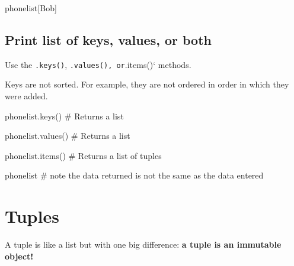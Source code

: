 \documentclass[
  letterpaper,
  DIV=11,
  numbers=noendperiod]{scrreprt}
\newenvironment{Shaded}{\begin{snugshade}}{\end{snugshade}}
\newcommand{\CommentTok}[1]{\textcolor[rgb]{0.37,0.37,0.37}{#1}}
\newcommand{\NormalTok}[1]{\textcolor[rgb]{0.00,0.23,0.31}{#1}}
\newcommand{\StringTok}[1]{\textcolor[rgb]{0.13,0.47,0.30}{#1}}
\begin{document}
\begin{Shaded}
\begin{Highlighting}[]
\NormalTok{phonelist[}\StringTok{\textquotesingle{}Bob\textquotesingle{}}\NormalTok{]}
\end{Highlighting}
\end{Shaded}

\hypertarget{print-list-of-keys-values-or-both-1}{%
\section{Print list of keys, values, or
both}\label{print-list-of-keys-values-or-both-1}}

Use the \texttt{.keys()},
\texttt{.values()\textquotesingle{},\ or}.items()` methods.

Keys are not sorted. For example, they are not ordered in order in which
they were added.

\begin{Shaded}
\begin{Highlighting}[]
\NormalTok{phonelist.keys() }\CommentTok{\# Returns a list}
\end{Highlighting}
\end{Shaded}

\begin{Shaded}
\begin{Highlighting}[]
\NormalTok{phonelist.values() }\CommentTok{\# Returns a list}
\end{Highlighting}
\end{Shaded}

\begin{Shaded}
\begin{Highlighting}[]
\NormalTok{phonelist.items() }\CommentTok{\# Returns a list of tuples}
\end{Highlighting}
\end{Shaded}

\begin{Shaded}
\begin{Highlighting}[]
\NormalTok{phonelist }\CommentTok{\# note the data returned is not the same as the data entered}
\end{Highlighting}
\end{Shaded}

\hypertarget{tuples-1}{%
\chapter{Tuples}\label{tuples-1}}

A tuple is like a list but with one big difference: \textbf{a tuple is
an immutable object!}
\end{document}
